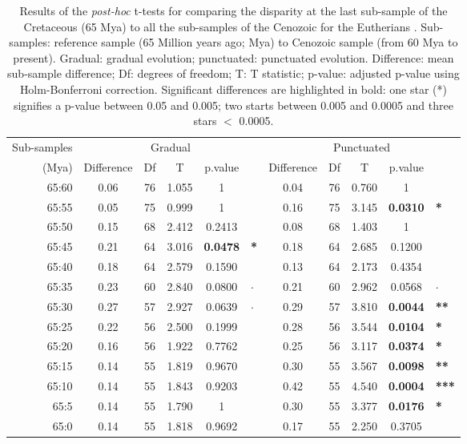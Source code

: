 \documentclass[12pt,letterpaper]{article}
\begin{document}
\begin{table}[ht]
\caption{Results of the \textit{post-hoc} t-tests for comparing the disparity at the last sub-sample of the Cretaceous (65 Mya) to all the sub-samples of the Cenozoic for the Eutherians \citep[data from][]{beckancient2014}. Sub-samples: reference sample (65 Million years ago; Mya) to Cenozoic sample (from 60 Mya to present). Gradual: gradual evolution; punctuated: punctuated evolution. Difference: mean sub-sample difference; Df: degrees of freedom; T: T statistic; p-value: adjusted p-value using Holm-Bonferroni correction. Significant differences are highlighted in bold: one star (*) signifies a p-value between 0.05 and 0.005; two starts between 0.005 and 0.0005 and three stars $<$ 0.0005.}
\label{tab:Tab_beck_raw}
\centering
\begin{tabular}{r|ccccl|ccccl}
  \hline
  Sub-samples & \multicolumn{5}{c|}{Gradual} & \multicolumn{5}{c}{Punctuated} \\
  (Mya) & Difference & Df & T & p.value & & Difference & Df & T & p.value &\\ 
  \hline
  65:60 & 0.06 & 76 & 1.055 & 1      & & 0.04 & 76 & 0.760 & 1      &\\ 
  65:55 & 0.05 & 75 & 0.999 & 1      & & 0.16 & 75 & 3.145 & \textbf{0.0310} & \textbf{*} \\ 
  65:50 & 0.15 & 68 & 2.412 & 0.2413 & & 0.08 & 68 & 1.403 & 1      &\\ 
  65:45 & 0.21 & 64 & 3.016 & \textbf{0.0478} & \textbf{*} & 0.18 & 64 & 2.685 & 0.1200 &\\ 
  65:40 & 0.18 & 64 & 2.579 & 0.1590 & & 0.13 & 64 & 2.173 & 0.4354 &\\ 
  65:35 & 0.23 & 60 & 2.840 & 0.0800 & $\cdotp$ & 0.21 & 60 & 2.962 & 0.0568 & $\cdotp$ \\ 
  65:30 & 0.27 & 57 & 2.927 & 0.0639 & $\cdotp$ & 0.29 & 57 & 3.810 & \textbf{0.0044} & \textbf{**} \\ 
  65:25 & 0.22 & 56 & 2.500 & 0.1999 & & 0.28 & 56 & 3.544 & \textbf{0.0104} & \textbf{*} \\ 
  65:20 & 0.16 & 56 & 1.922 & 0.7762 & & 0.25 & 56 & 3.117 & \textbf{0.0374} & \textbf{*}\\ 
  65:15 & 0.14 & 55 & 1.819 & 0.9670 & & 0.30 & 55 & 3.567 & \textbf{0.0098} & \textbf{**}\\ 
  65:10 & 0.14 & 55 & 1.843 & 0.9203 & & 0.42 & 55 & 4.540 & \textbf{0.0004} & \textbf{***} \\ 
  65:5  & 0.14 & 55 & 1.790 & 1      & & 0.30 & 55 & 3.377 & \textbf{0.0176} & \textbf{*} \\ 
  65:0  & 0.14 & 55 & 1.818 & 0.9692 & & 0.17 & 55 & 2.250 & 0.3705 \\ 
   \hline
\end{tabular}
\end{table}
\end{document}
